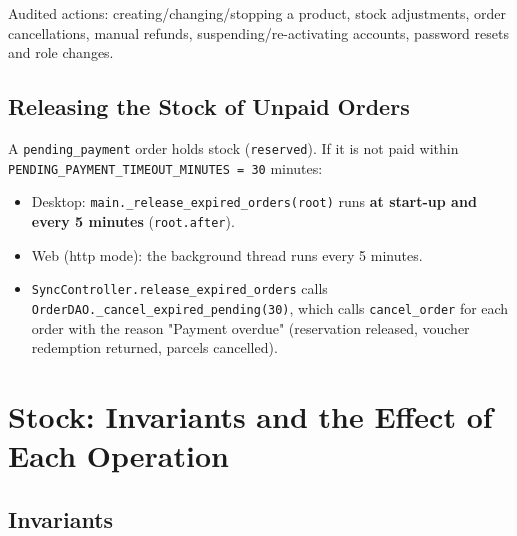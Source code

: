 Audited actions: creating/changing/stopping a product, stock
adjustments, order cancellations, manual refunds,
suspending/re-activating accounts, password resets and role changes.

\hypertarget{flow-expired}{%
\subsection{Releasing the Stock of Unpaid Orders}\label{flow-expired}}

A \texttt{pending\_\allowbreak{}payment} order holds stock (\texttt{reserved}). If it
is not paid within \texttt{PENDING\_\allowbreak{}PAYMENT\_\allowbreak{}TIMEOUT\_\allowbreak{}MINUTES =\allowbreak{} 30}
minutes:

\begin{itemize}
\tightlist
\item
  Desktop: \texttt{main.\allowbreak{}\_\allowbreak{}release\_\allowbreak{}expired\_\allowbreak{}orders(\allowbreak{}root)} runs
  \textbf{at start-up and every 5 minutes} (\texttt{root.\allowbreak{}after}).
\item
  Web (http mode): the background thread runs every 5 minutes.
\item
  \texttt{SyncController.\allowbreak{}release\_\allowbreak{}expired\_\allowbreak{}orders} calls
  \texttt{OrderDAO.\allowbreak{}\_\allowbreak{}cancel\_\allowbreak{}expired\_\allowbreak{}pending(\allowbreak{}30)}, which calls
  \texttt{cancel\_\allowbreak{}order} for each order with the reason "Payment
  overdue" (reservation released, voucher redemption returned, parcels
  cancelled).
\end{itemize}

\hypertarget{stock-invariants-and-the-effect-of-each-operation}{%
\section{Stock: Invariants and the Effect of Each
Operation}\label{stock-invariants-and-the-effect-of-each-operation}}

\hypertarget{invariants}{%
\subsection{Invariants}\label{invariants}}

